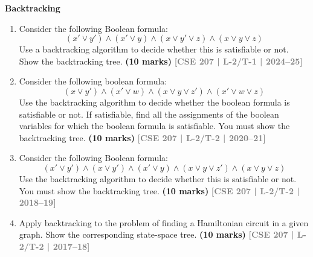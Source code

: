 \documentclass[12pt,a3paper]{article}
\newcommand{\yr}[1]{\hfill\textcolor{gray}{\small\textbf{[#1]}}}
\newcommand{\mk}[1]{\textcolor{orange!70!black}{\small\textbf{(#1 marks)}}}
\newcommand{\subtopic}[2]{%
  \vspace{10pt}
  \noindent\begin{tcolorbox}[colback=#1!8,colframe=#1,boxrule=0.6pt,arc=4pt,
    left=6pt,right=6pt,top=4pt,bottom=4pt]
    \small\bfseries\textcolor{#1}{#2}
  \end{tcolorbox}
  \vspace{2pt}
}
\begin{document}
\subtopic{cE}{Backtracking}
\label{sub:s5-backtrack}

\begin{enumerate}

\item Consider the following Boolean formula:
\[
  (x' \vee y') \wedge (x' \vee y) \wedge (x \vee y' \vee z) \wedge (x \vee y \vee z)
\]
Use a backtracking algorithm to decide whether this is satisfiable or not. Show the backtracking tree.
\mk{10} \yr{CSE 207 | L-2/T-1 | 2024--25}

\item Consider the following boolean formula:
\[
  (x \vee y') \wedge (x' \vee w) \wedge (x \vee y \vee z') \wedge (x' \vee w \vee z)
\]
Use the backtracking algorithm to decide whether the boolean formula is satisfiable or not. If satisfiable, find all the assignments of the boolean variables for which the boolean formula is satisfiable. You must show the backtracking tree.
\mk{10} \yr{CSE 207 | L-2/T-2 | 2020--21}

\item Consider the following Boolean formula:
\[
  (x' \vee y') \wedge (x \vee y') \wedge (x' \vee y) \wedge (x \vee y \vee z') \wedge (x \vee y \vee z)
\]
Use the backtracking algorithm to decide whether this is satisfiable or not. You must show the backtracking tree.
\mk{10} \yr{CSE 207 | L-2/T-2 | 2018--19}

\item Apply backtracking to the problem of finding a Hamiltonian circuit in a given graph. Show the corresponding state-space tree. \mk{10}
\yr{CSE 207 | L-2/T-2 | 2017--18}


\begin{center}
  
\end{center}
\end{enumerate}
\end{document}
